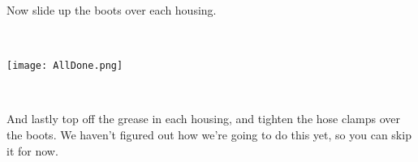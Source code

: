 \documentclass{article}
\newcommand{\fixthis}[1]{} %
\begin{document}
Now slide up the boots over each housing.

\begin{minipage}{\linewidth}
$\,$

\begin{center}
\texttt{[image: AllDone.png]}

\end{center}
$\,$
\end{minipage}

And lastly top off the grease in each housing, and tighten the hose clamps over the boots. We haven't figured out how we're going to do this yet, so you can skip it for now.





\begin{verbatim}

\end{verbatim}

\end{document}
